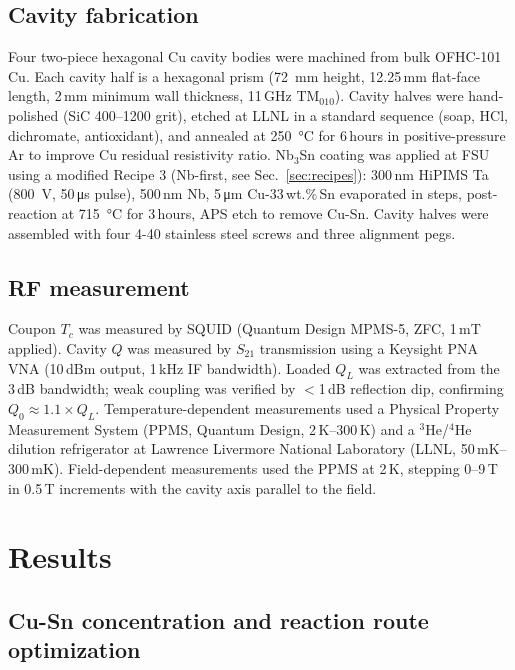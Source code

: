 \documentclass{iopjournal}
\begin{document}
\subsection{Cavity fabrication}

Four two-piece hexagonal Cu cavity bodies were machined from bulk OFHC-101 Cu. Each cavity half is a hexagonal prism (\qty{72}{\milli\meter} height, 12.25\,mm flat-face length, 2\,mm minimum wall thickness, 11\,GHz TM$_{010}$). Cavity halves were hand-polished (SiC 400--1200 grit), etched at LLNL in a standard sequence (soap, HCl, dichromate, antioxidant), and annealed at \qty{250}{\degreeCelsius} for 6\,hours in positive-pressure Ar to improve Cu residual resistivity ratio. Nb$_3$Sn coating was applied at FSU using a modified Recipe 3 (Nb-first, see Sec.~\ref{sec:recipes}): 300\,nm HiPIMS Ta (\qty{800}{\volt}, 50\,\unit{\micro\second} pulse), 500\,nm Nb, 5\,\unit{\micro\meter} Cu-33\,wt.\%\,Sn evaporated in steps, post-reaction at \qty{715}{\degreeCelsius} for 3\,hours, APS etch to remove Cu-Sn. Cavity halves were assembled with four 4-40 stainless steel screws and three alignment pegs.

\subsection{RF measurement}

Coupon $T_c$ was measured by SQUID (Quantum Design MPMS-5, ZFC, 1\,mT applied). Cavity $Q$ was measured by $S_{21}$ transmission using a Keysight PNA VNA (10\,dBm output, 1\,kHz IF bandwidth). Loaded $Q_L$ was extracted from the 3\,dB bandwidth; weak coupling was verified by $<$1\,dB reflection dip, confirming $Q_0 \approx 1.1 \times Q_L$. Temperature-dependent measurements used a Physical Property Measurement System (PPMS, Quantum Design, 2\,K--300\,K) and a $^3$He/$^4$He dilution refrigerator at Lawrence Livermore National Laboratory (LLNL, 50\,mK--300\,mK). Field-dependent measurements used the PPMS at 2\,K, stepping 0--9\,T in 0.5\,T increments with the cavity axis parallel to the field.


\section{Results}

\subsection{Cu-Sn concentration and reaction route optimization}
\end{document}
